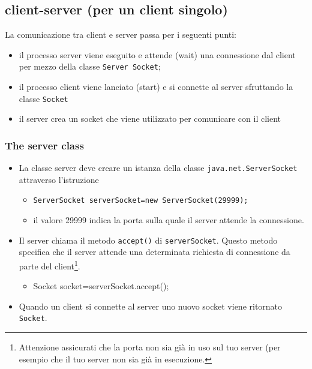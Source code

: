 \documentclass{article}
\begin{document}
\subsection{client-server (per un client singolo)} 
La comunicazione tra client e server passa per i seguenti punti:
\begin{itemize}
\item il processo server viene eseguito e attende (wait) una connessione dal client per mezzo della classe \texttt{Server Socket};
\item il processo client viene lanciato (start) e si connette al server sfruttando la classe \texttt{Socket}
\item il server crea un socket che viene utilizzato per comunicare con il client
\end{itemize}

\subsubsection{The server class}
\begin{itemize}
\item La classe server deve creare un istanza della classe \texttt{java.net.ServerSocket} attraverso l'istruzione
\begin{itemize}
\item \texttt{ServerSocket serverSocket=new ServerSocket(29999);}
\item il valore  29999 indica la porta sulla quale il server attende la connessione.
\end{itemize} 
\item Il server chiama il metodo  \texttt{accept()} di \texttt{serverSocket}. Questo metodo specifica che il server attende una determinata richiesta di connessione da parte del client\footnote{Attenzione assicurati che la porta non sia gi\`a in uso sul tuo server (per esempio che il tuo server non sia gi\`a in esecuzione.}.
\begin{itemize}
\item Socket socket=serverSocket.accept();
\end{itemize}
\item Quando un client si connette al server uno nuovo socket viene ritornato \texttt{Socket}.
\end{itemize}
\end{document}
